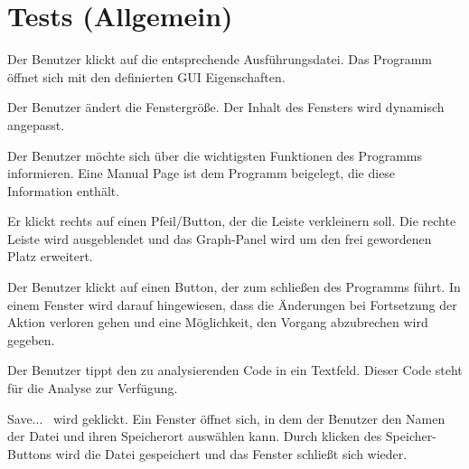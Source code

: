 \section{Tests (Allgemein)}



{Der Benutzer klickt auf die entsprechende Ausführungsdatei.}
{Das Programm öffnet sich mit den definierten GUI Eigenschaften.}

{Der Benutzer ändert die Fenstergröße.}
{Der Inhalt des Fensters wird dynamisch angepasst.}

{Der Benutzer möchte sich über die wichtigsten Funktionen des Programms informieren.}
{Eine Manual Page ist dem Programm beigelegt, die diese Information enthält.}

{Er klickt rechts auf einen Pfeil/Button, der die Leiste verkleinern soll.}
{Die rechte Leiste wird ausgeblendet und das Graph-Panel wird um den frei gewordenen Platz erweitert.}

{Der Benutzer klickt auf einen Button, der zum schließen des Programms führt.}
{In einem Fenster wird darauf hingewiesen, dass die Änderungen bei Fortsetzung der Aktion verloren gehen und eine Möglichkeit, den Vorgang abzubrechen wird gegeben.}




{Der Benutzer tippt den zu analysierenden Code in ein Textfeld.}
{Dieser Code steht für die Analyse zur Verfügung.}

{\glqq Save... \grqq\ wird geklickt.}
{Ein Fenster öffnet sich, in dem der Benutzer den Namen der Datei und ihren Speicherort auswählen kann. Durch klicken des \glqq Speicher\grqq -Buttons wird die Datei gespeichert und das Fenster schließt sich wieder.}


